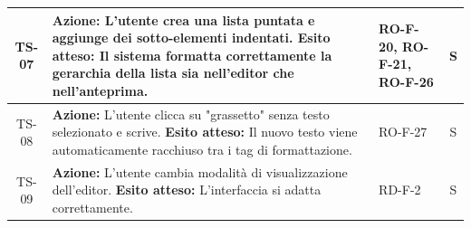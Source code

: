 \documentclass[11pt,a4paper]{article}
\begin{document}
\begin{longtable}{|c|p{9cm}|p{3cm}|c|}
\hline
TS-07 & \textbf{Azione:} L'utente crea una lista puntata e aggiunge dei sotto-elementi indentati. \newline \textbf{Esito atteso:} Il sistema formatta correttamente la gerarchia della lista sia nell'editor che nell'anteprima. & RO-F-20, RO-F-21, RO-F-26 & S \\
\hline
TS-08 & \textbf{Azione:} L'utente clicca su "grassetto" senza testo selezionato e scrive. \newline \textbf{Esito atteso:} Il nuovo testo viene automaticamente racchiuso tra i tag di formattazione. & RO-F-27 & S \\
\hline
TS-09 & \textbf{Azione:} L'utente cambia modalità di visualizzazione dell'editor. \newline \textbf{Esito atteso:} L'interfaccia si adatta correttamente. & RD-F-2 & S \\
\hline


\end{longtable}
\end{document}

